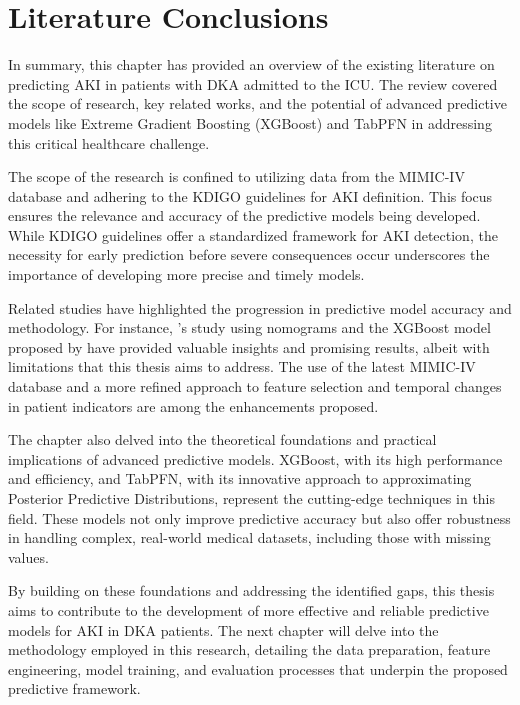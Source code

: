 \documentclass[../main.tex]{subfiles}
\begin{document}
\section{Literature Conclusions}

In summary, this chapter has provided an overview of the existing literature on predicting \gls{AKI} in patients with \gls{DKA} admitted to the \gls{ICU}. The review covered the scope of research, key related works, and the potential of advanced predictive models like Extreme Gradient Boosting (XGBoost) and TabPFN in addressing this critical healthcare challenge.

The scope of the research is confined to utilizing data from the \gls{MIMIC-IV} database and adhering to the KDIGO guidelines for \gls{AKI} definition. This focus ensures the relevance and accuracy of the predictive models being developed. While KDIGO guidelines offer a standardized framework for \gls{AKI} detection, the necessity for early prediction before severe consequences occur underscores the importance of developing more precise and timely models.

Related studies have highlighted the progression in predictive model accuracy and methodology. For instance, \citeauthor{monogram-aki-dka}'s study using nomograms and the XGBoost model proposed by \citeauthor{xgboost-aki-dka} have provided valuable insights and promising results, albeit with limitations that this thesis aims to address. The use of the latest \gls{MIMIC-IV} database and a more refined approach to feature selection and temporal changes in patient indicators are among the enhancements proposed.

The chapter also delved into the theoretical foundations and practical implications of advanced predictive models. XGBoost, with its high performance and efficiency, and TabPFN, with its innovative approach to approximating Posterior Predictive Distributions, represent the cutting-edge techniques in this field. These models not only improve predictive accuracy but also offer robustness in handling complex, real-world medical datasets, including those with missing values.

By building on these foundations and addressing the identified gaps, this thesis aims to contribute to the development of more effective and reliable predictive models for \gls{AKI} in \gls{DKA} patients. The next chapter will delve into the methodology employed in this research, detailing the data preparation, feature engineering, model training, and evaluation processes that underpin the proposed predictive framework.
\end{document}
